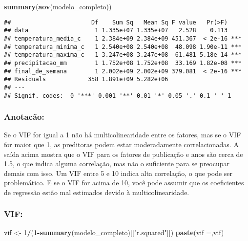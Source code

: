 \documentclass[
]{article}
\newenvironment{Shaded}{\begin{snugshade}}{\end{snugshade}}
\newcommand{\DecValTok}[1]{\textcolor[rgb]{0.00,0.00,0.81}{#1}}
\newcommand{\FunctionTok}[1]{\textcolor[rgb]{0.13,0.29,0.53}{\textbf{#1}}}
\newcommand{\NormalTok}[1]{#1}
\newcommand{\OtherTok}[1]{\textcolor[rgb]{0.56,0.35,0.01}{#1}}
\newcommand{\SpecialCharTok}[1]{\textcolor[rgb]{0.81,0.36,0.00}{\textbf{#1}}}
\newcommand{\StringTok}[1]{\textcolor[rgb]{0.31,0.60,0.02}{#1}}
\begin{document}
\begin{Shaded}
\begin{Highlighting}[]
\FunctionTok{summary}\NormalTok{(}\FunctionTok{aov}\NormalTok{(modelo\_completo))}
\end{Highlighting}
\end{Shaded}

\begin{verbatim}
##                       Df    Sum Sq   Mean Sq F value   Pr(>F)    
## data                   1 1.335e+07 1.335e+07   2.528    0.113    
## temperatura_media_c    1 2.384e+09 2.384e+09 451.367  < 2e-16 ***
## temperatura_minima_c   1 2.540e+08 2.540e+08  48.098 1.90e-11 ***
## temperatura_maxima_c   1 3.247e+08 3.247e+08  61.481 5.18e-14 ***
## precipitacao_mm        1 1.752e+08 1.752e+08  33.169 1.82e-08 ***
## final_de_semana        1 2.002e+09 2.002e+09 379.081  < 2e-16 ***
## Residuals            358 1.891e+09 5.282e+06                     
## ---
## Signif. codes:  0 '***' 0.001 '**' 0.01 '*' 0.05 '.' 0.1 ' ' 1
\end{verbatim}

\hypertarget{anotacuxe3o}{%
\subsubsection{Anotacão:}\label{anotacuxe3o}}

Se o VIF for igual a 1 não há multicolinearidade entre os fatores, mas
se o VIF for maior que 1, as preditoras podem estar moderadamente
correlacionadas. A saída acima mostra que o VIF para os fatores de
publicação e anos são cerca de 1.5, o que indica alguma correlação, mas
não o suficiente para se preocupar demais com isso. Um VIF entre 5 e 10
indica alta correlação, o que pode ser problemático. E se o VIF for
acima de 10, você pode assumir que os coeficientes de regressão estão
mal estimados devido à multicolinearidade.

\hypertarget{vif}{%
\subsubsection{VIF:}\label{vif}}

\begin{Shaded}
\begin{Highlighting}[]
\NormalTok{vif }\OtherTok{\textless{}{-}} \DecValTok{1}\SpecialCharTok{/}\NormalTok{(}\DecValTok{1}\SpecialCharTok{{-}}\FunctionTok{summary}\NormalTok{(modelo\_completo)[[}\StringTok{"r.squared"}\NormalTok{]])}
\FunctionTok{paste}\NormalTok{(}\StringTok{\textquotesingle{}vif =\textquotesingle{}}\NormalTok{,vif)}
\end{Highlighting}
\end{Shaded}
\end{document}
